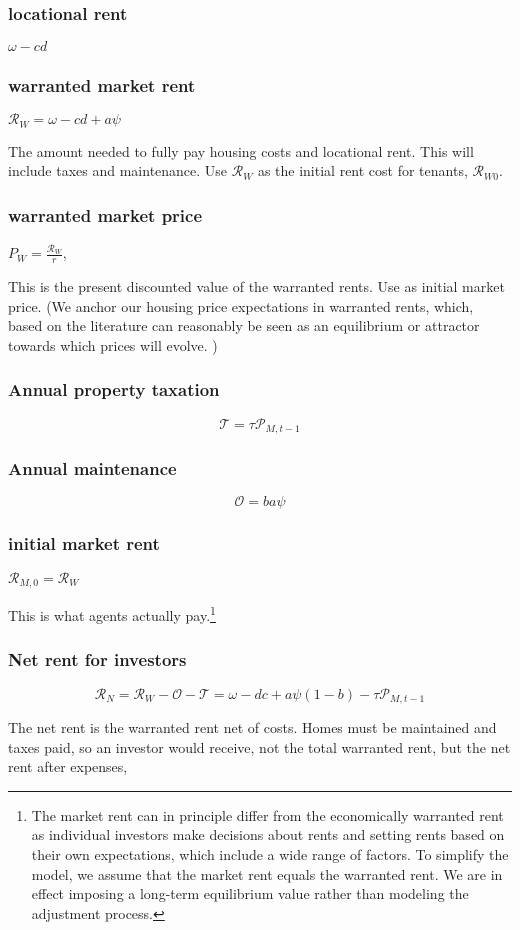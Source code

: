 \subsubsection{locational rent}  $\omega-cd$ 

\subsubsection{warranted market rent} $\mathcal{R}_W=\omega-cd +a\psi$

The amount needed to fully pay housing costs and locational rent. This will include taxes and maintenance. Use  $\mathcal{R}_W$ as the initial rent cost for tenants,  $\mathcal{R}_{W0}$.

\subsubsection{warranted market price}   $P_W=\frac{\mathcal{R}_W }{r}$,  

This is the present discounted value of the warranted rents.  Use as initial market price.  (We anchor our housing price expectations in warranted rents, which, based on the literature can reasonably be seen as an equilibrium or attractor towards which prices will evolve. )

\subsubsection{Annual property taxation}
\[\mathcal{T} = \tau  \mathcal{P}_{M, t-1}\]

\subsubsection{Annual maintenance}
\[\mathcal{O}=   ba\psi \]

 {\color{blue}
\subsubsection{initial \gls{market rent}} 
$\mathcal{R}_{M, 0}= \mathcal{R}_W$ 


This is what agents actually pay.\footnote{The market rent can in principle differ from the economically warranted rent as individual investors make decisions about rents and setting rents based on their own expectations, which include a wide range of factors. To simplify the model, we assume that the market rent equals the warranted rent. We are in effect imposing a long-term equilibrium value rather than modeling the adjustment process.} 


\subsubsection{Net rent for investors} {\color{green}}
\[\mathcal{R}_N = \mathcal{R}_W - \mathcal{O} - \mathcal{T}= \omega - {dc} + a\psi(1-b) -\tau  \mathcal{P}_{M, t-1}\]

The \gls{net rent} is the warranted rent net of costs. Homes must be maintained and taxes paid, so an investor would receive, not the total warranted rent, but the net rent after expenses,
}


